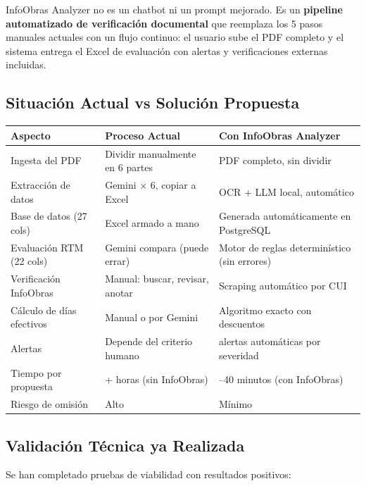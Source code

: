 \documentclass[11pt,a4paper]{article}
\begin{document}
InfoObras Analyzer no es un chatbot ni un prompt mejorado. Es un \textbf{pipeline automatizado de verificación documental} que reemplaza los 5 pasos manuales actuales con un flujo continuo: el usuario sube el PDF completo y el sistema entrega el Excel de evaluación con alertas y verificaciones externas incluidas.

\subsection{Situación Actual vs Solución Propuesta}
\begin{center}
\begin{tabular}{|>{\raggedright\arraybackslash}m{3.2cm}|>{\raggedright\arraybackslash}m{5cm}|>{\raggedright\arraybackslash}m{5cm}|}
\hline
\textbf{Aspecto} & \textbf{Proceso Actual} & \textbf{Con InfoObras Analyzer} \\
\hline
Ingesta del PDF & Dividir manualmente en 6 partes & PDF completo, sin dividir \\
\hline
Extracción de datos & Gemini × 6, copiar a Excel & OCR + LLM local, automático \\
\hline
Base de datos (27 cols) & Excel armado a mano & Generada automáticamente en PostgreSQL \\
\hline
Evaluación RTM (22 cols) & Gemini compara (puede errar) & Motor de reglas determinístico (sin errores) \\
\hline
Verificación InfoObras & Manual: buscar, revisar, anotar & Scraping automático por CUI \\
\hline
Cálculo de días efectivos & Manual o por Gemini & Algoritmo exacto con descuentos \\
\hline
Alertas & Depende del criterio humano & alertas automáticas por severidad \\
\hline
Tiempo por propuesta & 6+ horas (sin InfoObras) & 20--40 minutos (con InfoObras) \\
\hline
Riesgo de omisión & Alto & Mínimo \\
\hline
\end{tabular}
\end{center}

\subsection{Validación Técnica ya Realizada}

Se han completado pruebas de viabilidad con resultados positivos:
\end{document}
